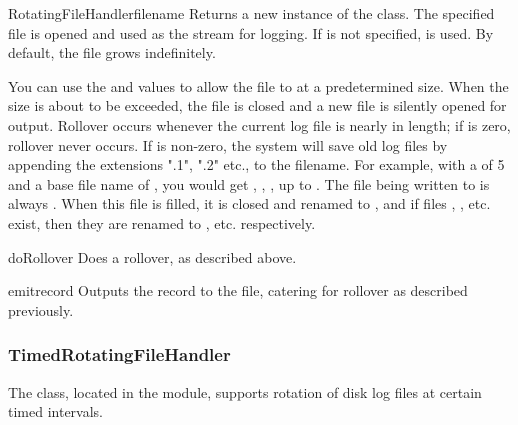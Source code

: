 \begin{classdesc}{RotatingFileHandler}{filename}
Returns a new instance of the  class. The
specified file is opened and used as the stream for logging. If
 is not specified,  is used. By default, the
file grows indefinitely.

You can use the  and
 values to allow the file to  at a
predetermined size. When the size is about to be exceeded, the file is
closed and a new file is silently opened for output. Rollover occurs
whenever the current log file is nearly  in length; if
 is zero, rollover never occurs.  If 
is non-zero, the system will save old log files by appending the
extensions ".1", ".2" etc., to the filename. For example, with
a  of 5 and a base file name of
, you would get ,
, , up to . The file being
written to is always .  When this file is filled, it is
closed and renamed to , and if files ,
, etc.  exist, then they are renamed to ,
 etc.  respectively.
\end{classdesc}

\begin{methoddesc}{doRollover}{}
Does a rollover, as described above.
\end{methoddesc}

\begin{methoddesc}{emit}{record}
Outputs the record to the file, catering for rollover as described previously.
\end{methoddesc}

\subsubsection{TimedRotatingFileHandler}

The  class, located in the
 module, supports rotation of disk log files
at certain timed intervals.

